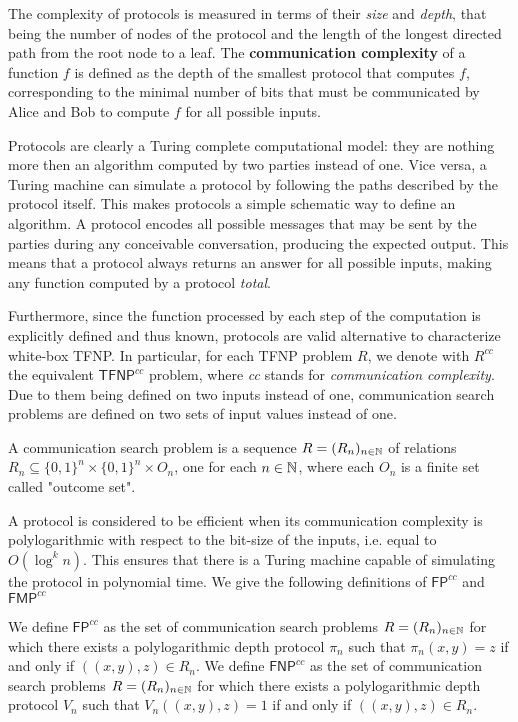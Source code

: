 The complexity of protocols is measured in terms of their \textit{size} and \textit{depth}, that being the number of nodes of the protocol and the length of the longest directed path from the root node to a leaf. The \textbf{communication complexity} of a function $f$ is defined as the depth of the smallest protocol that computes $f$, corresponding to the minimal number of bits that must be communicated by Alice and Bob to compute $f$ for all possible inputs.

Protocols are clearly a Turing complete computational model: they are nothing more then an algorithm computed by two parties instead of one. Vice versa, a Turing machine can simulate a protocol by following the paths described by the protocol itself. This makes protocols a simple schematic way to define an algorithm. A protocol encodes all possible messages that may be sent by the parties during any conceivable conversation, producing the expected output. This means that a protocol always returns an answer for all possible inputs, making any function computed by a protocol \textit{total}. 

Furthermore, since the function processed by each step of the computation is explicitly defined and thus known, protocols are valid alternative to characterize white-box \textsf{TFNP}. In particular, for each \textsf{TFNP} problem $R$, we denote with $R^{cc}$ the equivalent $\mathsf{TFNP}^{cc}$ problem, where \textit{cc} stands for \textit{communication complexity}. Due to them being defined on two inputs instead of one, communication search problems are defined on two sets of input values instead of one.

\begin{definition}
    A communication search problem is a sequence $R = (R_n)_{n \in \mathbb{N}}$ of relations $R_n \subseteq \{0,1\}^n \times \{0,1\}^n \times O_n$, one for each $n \in \mathbb{N}$, where each $O_n$ is a finite set called "outcome set".
\end{definition}

A protocol is considered to be efficient when its communication complexity is polylogarithmic with respect to the bit-size of the inputs, i.e. equal to $O(\log^k n)$. This ensures that there is a Turing machine capable of simulating the protocol in polynomial time. We give the following definitions of $\mathsf{FP}^{cc}$ and $\mathsf{FMP}^{cc}$

\begin{definition}
    We define $\mathsf{FP}^{cc}$ as the set of communication search problems $R = (R_n)_{n \in \mathbb{N}}$ for which there exists a polylogarithmic depth protocol $\pi_n$ such that $\pi_n(x,y) = z$ if and only if $((x,y), z) \in R_n$.
    \newpage
    We define $\mathsf{FNP}^{cc}$ as the set of communication search problems $R = (R_n)_{n \in \mathbb{N}}$ for which there exists a polylogarithmic depth protocol $V_n$ such that $V_n((x,y), z) = 1$ if and only if $((x,y), z) \in R_n$. 
\end{definition}

